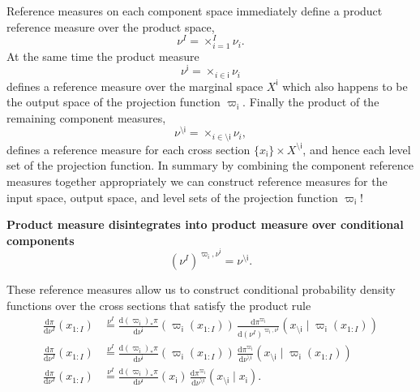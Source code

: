 \documentclass[11pt, oneside]{article}
\newcommand{\rnd}[2]{
  \ensuremath{ \frac{ \mathrm{d} #1}{ \mathrm{d} #2 } }
}
\begin{document}
Reference measures on each component space immediately define a product reference 
measure over the product space,
%
\begin{equation*}
\nu^{I} = \times_{i = 1}^{I} \nu_{i}.
\end{equation*}
%
At the same time the product measure
%
\begin{equation*}
\nu^{\mathsf{i}} = \times_{i \in \mathsf{i} } \nu_{i}
\end{equation*}
%
defines a reference measure over the marginal space $X^{\mathsf{i}}$ which also 
happens to be the output space of the projection function $\varpi_{\mathsf{i}}$.
Finally the product of the remaining component measures,
%
\begin{equation*}
\nu^{\setminus \mathsf{i}} = \times_{i \in \setminus \mathsf{i} } \nu_{i},
\end{equation*}
%
defines a reference measure for each cross section 
$\{ x_{\mathsf{i}} \} \times X^{\setminus \mathsf{i}}$, and hence each level 
set of the projection function.  In summary by combining the component 
reference measures together appropriately we can construct reference measures
for the input space, output space, and level sets of the projection function 
$\varpi_{\mathsf{i}}$!

\textbf{Product measure disintegrates into product measure over conditional 
components}
%
\begin{equation*}
(\nu^{I})^{\varpi_{\mathsf{i}}, \nu^{\mathsf{i}}} = \nu^{\setminus \mathsf{i}}.
\end{equation*}

These reference measures allow us to construct conditional probability 
density functions over the cross sections that satisfy the product rule
%
\begin{align*}
\rnd{\pi}{ \nu^{I} }(x_{1:I})
&\overset{ \nu^{I} }{ = }
\rnd{ (\varpi_{\mathsf{i}})_{*} \pi }{\nu^{\mathsf{i}}} (\varpi_{\mathsf{i}}(x_{1:I})) \,
\rnd{ \pi^{\varpi_{\mathsf{i}}} }{ (\nu^{I})^{\varpi_{\mathsf{i}}, \nu^{\mathsf{i}}} } (x_{\setminus \mathsf{i}}  \mid \varpi_{\mathsf{i}}(x_{1:I}))
\\
\rnd{\pi}{ \nu^{I} }(x_{1:I})
&\overset{ \nu^{I} }{ = }
\rnd{ (\varpi_{\mathsf{i}})_{*} \pi }{\nu^{\mathsf{i}}} (\varpi_{\mathsf{i}}(x_{1:I})) \,
\rnd{ \pi^{\varpi_{\mathsf{i}}} }{ \nu^{\setminus \mathsf{i}} } (x_{\setminus \mathsf{i}}  \mid \varpi_{\mathsf{i}}(x_{1:I}))
\\
\rnd{\pi}{ \nu^{I} }(x_{1:I})
&\overset{ \nu^{I} }{ = }
\rnd{ (\varpi_{\mathsf{i}})_{*} \pi }{\nu^{\mathsf{i}}} (x_{\mathsf{i}}) \,
\rnd{ \pi^{\varpi_{\mathsf{i}}} }{ \nu^{\setminus \mathsf{i}} } (x_{\setminus \mathsf{i}}  \mid x_{\mathsf{i}}).
\end{align*}
\end{document}
